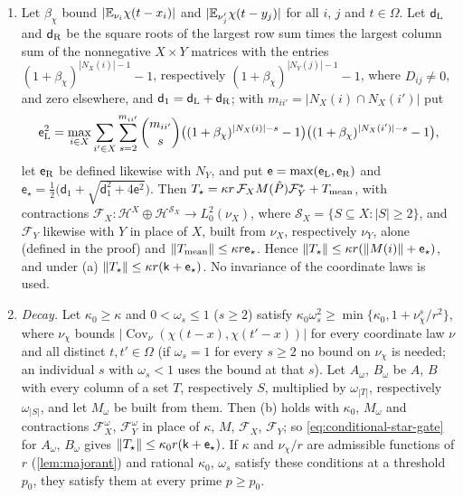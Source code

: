 \begin{proposition}
\begin{enumerate}[label=\textup{(\alph*)}]
\item Let $\beta_\chi$ bound $|\mathbb E_{\nu_i}\chi(t-x_i)|$ and $|\mathbb E_{\nu'_j}\chi(t-y_j)|$ for
 all $i$, $j$ and $t\in\Omega$. Let $\mathsf d_{\rm L}$ and $\mathsf d_{\rm R}$ be the
 square roots of the largest row sum times the largest column sum of the nonnegative
 $X\times Y$ matrices with the entries $(1+\beta_\chi)^{|N_X(i)|-1}-1$, respectively
 $(1+\beta_\chi)^{|N_Y(j)|-1}-1$, where $D_{ij}\ne0$, and zero elsewhere, and
 $\mathsf d_1=\mathsf d_{\rm L}+\mathsf d_{\rm R}$; with $m_{ii'}=|N_X(i)\cap N_X(i')|$ put
 \[
  \mathsf e_{\rm L}^2=\max_{i\in X}\sum_{i'\in X}\sum_{s=2}^{m_{ii'}}\binom{m_{ii'}}s
  \bigl((1+\beta_\chi)^{|N_X(i)|-s}-1\bigr)\bigl((1+\beta_\chi)^{|N_X(i')|-s}-1\bigr),
 \]
 let $\mathsf e_{\rm R}$ be defined likewise with $N_Y$, and put
 $\mathsf e=\max(\mathsf e_{\rm L},\mathsf e_{\rm R})$ and
 $\mathsf e_\star=\frac12\bigl(\mathsf d_1+\sqrt{\mathsf d_1^2+4\mathsf e^2}\bigr)$. Then
 $T_\star=\kappa r\,\mathcal F_XM(\hat P)\mathcal F_Y^*+T_{\rm mean}$, with contractions
 $\mathcal F_X\colon\mathcal H^X\oplus\mathcal H^{\mathcal S_X}\to L^2_0(\nu_X)$,
 where $\mathcal S_X=\{S\subseteq X:|S|\ge2\}$, and $\mathcal F_Y$ likewise
 with $Y$ in place of $X$, built from $\nu_X$, respectively $\nu_Y$, alone
 (defined in the proof) and $\left\|T_{\rm mean}\right\|\le\kappa r\mathsf e_\star$. Hence
 $\left\|T_\star\right\|\le\kappa r(\left\|M(i)\right\|+\mathsf e_\star)$, and under (a)
 $\left\|T_\star\right\|\le\kappa r(\mathsf k+\mathsf e_\star)$. No invariance of the coordinate
 laws is used.
\item \emph{Decay.} Let $\kappa_0\ge\kappa$ and $0<\omega_s\le1$ ($s\ge2$) satisfy
 $\kappa_0\omega_s^2\ge\min\{\kappa_0,1+\nu_\chi^s/r^2\}$, where $\nu_\chi$ bounds
 $|\operatorname{Cov}_\nu(\chi(t-x),\chi(t'-x))|$ for every coordinate law $\nu$ and
 all distinct $t,t'\in\Omega$ (if $\omega_s=1$ for every $s\ge2$ no bound on
 $\nu_\chi$ is needed; an individual $s$ with $\omega_s<1$ uses the bound at
 that $s$). Let
 $A_\omega$, $B_\omega$ be $A$, $B$ with every column of a set $T$, respectively $S$,
 multiplied by $\omega_{|T|}$, respectively $\omega_{|S|}$, and let $M_\omega$ be built
 from them. Then (b) holds with $\kappa_0$, $M_\omega$ and contractions
 $\mathcal F^\omega_X$, $\mathcal F^\omega_Y$ in place of $\kappa$, $M$, $\mathcal F_X$,
 $\mathcal F_Y$; so \eqref{eq:conditional-star-gate} for $A_\omega$, $B_\omega$ gives
 $\left\|T_\star\right\|\le\kappa_0r(\mathsf k+\mathsf e_\star)$. If $\kappa$ and $\nu_\chi/r$
 are admissible functions of $r$ (\cref{lem:majorant}) and rational $\kappa_0$,
 $\omega_s$ satisfy these conditions at a threshold $p_0$, they satisfy them at every
 prime $p\ge p_0$.
\end{enumerate}
\end{proposition}

